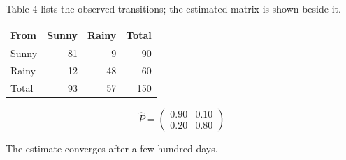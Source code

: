 \documentclass{article}
\begin{document}
Table 4 lists the observed transitions; the estimated matrix is shown beside it.

\begin{table}[h]
\begin{minipage}{0.55\textwidth}\centering
\begin{tabular}{lrrr}
\toprule
From & Sunny & Rainy & Total \\
\midrule
Sunny & 81 & 9 & 90 \\
Rainy & 12 & 48 & 60 \\
Total & 93 & 57 & 150 \\
\bottomrule
\end{tabular}
\end{minipage}%
\begin{minipage}{0.4\textwidth}
\[ \hat P = \begin{pmatrix} 0.90 & 0.10 \\ 0.20 & 0.80 \end{pmatrix} \]
\end{minipage}
\end{table}

The estimate converges after a few hundred days.
\end{document}

